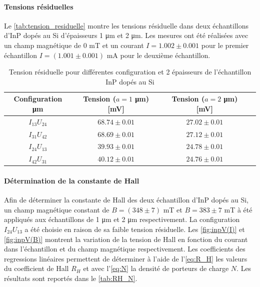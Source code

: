 \begin{minipage}{\textwidth}
    \paragraph*{Tensions résiduelles}
    Le \autoref{tab:tension_residuelle} montre les tensions résiduelle dans deux échantillons d'InP dopés au Si d'épaisseurs 1 \si{\micro\meter} et 2 \si{\micro\meter}. Les mesures ont été réalisées avec un champ magnétique de 0 \si{\milli\tesla} et un courant \(I = 1.002 \pm 0.001\) pour le premier échantillon \(I = (1.001 \pm 0.001)\) \si{\milli\ampere} pour le deuxième échantillon.
\end{minipage}

\begin{table}[h]
    \centering
    \begin{tabulary}{\textwidth}{C C C C}
        \toprule
        Configuration \si{\micro\meter} & Tension (\(a = 1\) \si{\micro\meter}) [\si{\milli\volt}] & Tension (\(a = 2\) \si{\micro\meter}) [\si{\milli\volt}] \\
        \midrule
        \(I_{13}U_{24}\) & \(68.74 \pm 0.01\) & \(27.02 \pm 0.01\) \\
        \(I_{31}U_{42}\) & \(68.69 \pm 0.01\) & \(27.12 \pm 0.01\) \\
        \(I_{24}U_{13}\) & \(39.93 \pm 0.01\) & \(24.78 \pm 0.01\) \\
        \(I_{42}U_{31}\) & \(40.12 \pm 0.01\) & \(24.76 \pm 0.01\) \\
        \bottomrule
    \end{tabulary}
    \caption{Tension résiduelle pour différentes configuration et 2 épaisseurs de l'échantillon InP dopés au Si}
    \label{tab:tension_residuelle}
\end{table}

\paragraph*{Détermination de la constante de Hall}
Afin de déterminer la constante de Hall des deux échantillon d'InP dopés au Si, un champ magnétique constant de \(B = (348 \pm 7)\) \si{\milli\tesla} et \(B = 383 \pm 7\) \si{\milli\tesla} à été appliqués aux échantillons de 1 \si{\micro\meter} et 2 \si{\micro\meter} respectivement. La configuration \(I_{24}U_{13}\) a été choisie en raison de sa faible tension résiduelle. Les \autoref{fig:inpV(I)} et \autoref{fig:inpV(B)} montrent la variation de la tension de Hall en fonction du courant dans l'échantillon et du champ magnétique respectivement. Les coefficients des regressions linéaires permettent de déterminer à l'aide de l'\autoref{eq:R_H} les valeurs du coefficient de Hall \(R_H\) et avec l'\autoref{eq:N} la densité de porteurs de charge \(N\). Les résultats sont reportés dans le \autoref{tab:RH_N}.

